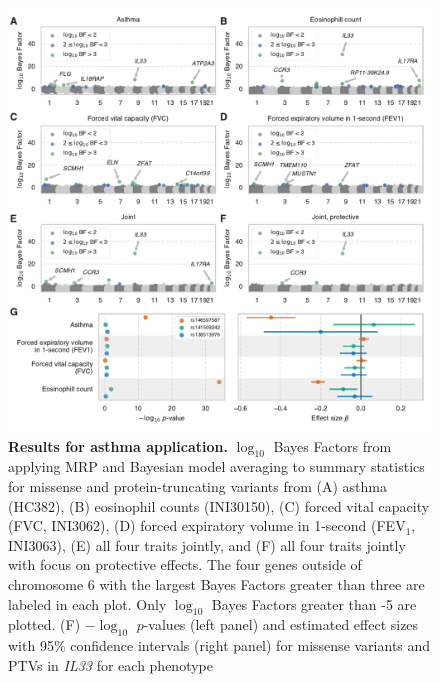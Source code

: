 \begin{figure}[!h]
\includegraphics[width=\textwidth]{../figures/Figure_03.pdf}
\caption{{\bf Results for asthma application.}
$\log_{10}$ Bayes Factors from applying MRP and Bayesian model averaging to summary statistics for missense and protein-truncating variants from (A) asthma (HC382), (B) eosinophil counts (INI30150), (C) forced vital capacity (FVC, INI3062), (D) forced expiratory volume in 1-second (FEV$_1$, INI3063), (E) all four traits jointly, and (F) all four traits jointly with focus on protective effects. The four genes outside of chromosome 6 with the largest Bayes Factors greater than three are labeled in each plot. Only $\log_{10}$ Bayes Factors greater than -5 are plotted. (F) $-\log_{10}$ $p$-values (left panel) and estimated effect sizes with 95\% confidence intervals (right panel) for missense variants and PTVs in \textit{IL33} for each phenotype}
\label{asthma_bma}
\end{figure}


